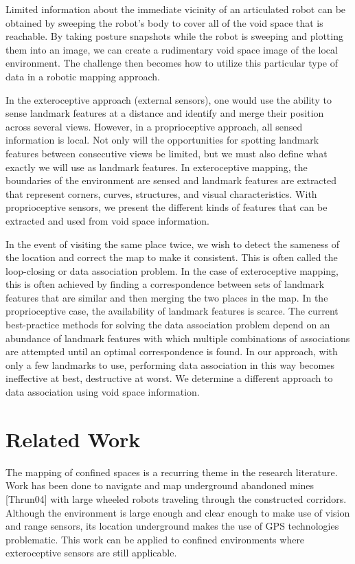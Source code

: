 Limited information about the immediate vicinity of an articulated robot can be obtained by sweeping the robot’s body to cover all of the void space that is reachable. By taking posture snapshots while the robot is sweeping and plotting them into an image, we can create a rudimentary void space image of the local environment. The challenge then becomes how to utilize this particular type of data in a robotic mapping approach. 

In the exteroceptive approach (external sensors), one would use the ability to sense landmark features at a distance and identify and merge their position across several views. However, in a proprioceptive approach, all sensed information is local. Not only will the opportunities for spotting landmark features between consecutive views be limited, but we must also define what exactly we will use as landmark features. In exteroceptive mapping, the boundaries of the environment are sensed and landmark features are extracted that represent corners, curves, structures, and visual characteristics. With proprioceptive sensors, we present the different kinds of features that can be extracted and used from void space information.

In the event of visiting the same place twice, we wish to detect the sameness of the location and correct the map to make it consistent. This is often called the loop-closing or data association problem. In the case of exteroceptive mapping, this is often achieved by finding a correspondence between sets of landmark features that are similar and then merging the two places in the map. In the proprioceptive case, the availability of landmark features is scarce. The current best-practice methods for solving the data association problem depend on an abundance of landmark features with which multiple combinations of associations are attempted until an optimal correspondence is found. In our approach, with only a few landmarks to use, performing data association in this way becomes ineffective at best, destructive at worst. We determine a different approach to data association using void space information.

\section{Related Work}
\label{relatedwork}

The mapping of confined spaces is a recurring theme in the research literature. Work has been done to navigate and map underground abandoned mines [Thrun04] with large wheeled robots traveling through the constructed corridors. Although the environment is large enough and clear enough to make use of vision and range sensors, its location underground makes the use of GPS technologies problematic. This work can be applied to confined environments where exteroceptive sensors are still applicable.

